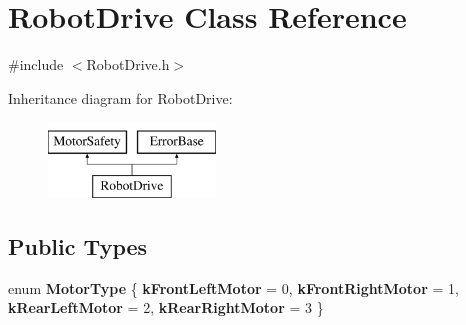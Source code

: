 \hypertarget{classRobotDrive}{
\section{RobotDrive Class Reference}
\label{classRobotDrive}
}


{\ttfamily \#include $<$RobotDrive.h$>$}

Inheritance diagram for RobotDrive:\begin{figure}[H]
\begin{center}
\leavevmode
\includegraphics[height=2.000000cm]{classRobotDrive}
\end{center}
\end{figure}
\subsection*{Public Types}
\begin{DoxyCompactItemize}
\item 
enum {\bfseries MotorType} \{ {\bfseries kFrontLeftMotor} =  0, 
{\bfseries kFrontRightMotor} =  1, 
{\bfseries kRearLeftMotor} =  2, 
{\bfseries kRearRightMotor} =  3
 \}
\end{DoxyCompactItemize}
